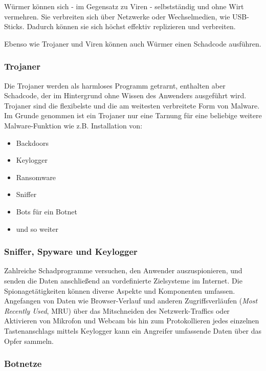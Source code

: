Würmer können sich - im Gegensatz zu Viren - selbstständig und ohne Wirt vermehren. Sie verbreiten sich über Netzwerke oder Wechselmedien, wie USB-Sticks. Dadurch können sie sich höchst effektiv replizieren und verbreiten.

Ebenso wie Trojaner und Viren können auch Würmer einen Schadcode ausführen.

\subsubsection{Trojaner}
\label{sec:Trojaner}

Die Trojaner werden als harmloses Programm getrarnt, enthalten aber Schadcode, der im Hintergrund ohne Wissen des Anwenders ausgeführt wird. Trojaner sind die flexibelste und die am weitesten verbreitete Form von Malware. Im Grunde genommen ist ein Trojaner nur eine Tarnung für eine beliebige weitere Malware-Funktion wie z.B. Installation von:

\begin{multicols}{2}
	\begin{itemize}
		\item Backdoors
		\item Keylogger
		\item Ransomware
		\item Sniffer
		\item Bots für ein Botnet
		\item und so weiter
	\end{itemize}
\end{multicols}

\subsubsection{Sniffer, Spyware und Keylogger}
\label{sec:SnifferSpywareKeylogger}

Zahlreiche Schadprogramme versuchen, den Anwender auszuspionieren, und senden die Daten anschließend an vordefinierte Zielsysteme im Internet. Die Spionagetätigkeiten können diverse Aspekte und Komponenten umfassen. Angefangen von Daten wie Browser-Verlauf und anderen Zugriffsverläufen (\textit{Most Recently Used}, MRU) über das Mitschneiden des Netzwerk-Traffics oder Aktivieren von Mikrofon und Webcam bis hin zum Protokollieren jedes einzelnen Tastenanschlags mittels Keylogger kann ein Angreifer umfassende Daten über das Opfer sammeln.

\subsubsection{Botnetze}
\label{sec:Botnetze}

